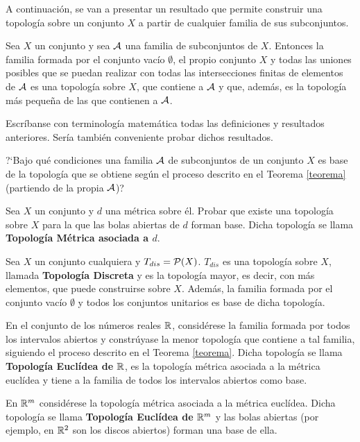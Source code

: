 \documentclass[cursovd_portada.tex]{subfiles}
\begin{document}
A continuación, se van a presentar un resultado que permite construir una topología sobre un conjunto $X$ a partir
de cualquier familia de sus subconjuntos.
\begin{teorema}\label{teorema}
Sea $X$ un conjunto y sea ${\cal A}$ una familia de subconjuntos de $X$. Entonces la familia formada por el
conjunto vacío $\emptyset$, el propio conjunto $X$ y todas las uniones posibles que se puedan realizar con todas
las intersecciones finitas de elementos de ${\cal A}$ es una topología sobre $X$, que contiene a ${\cal A}$ y que,
además, es la topología más peque\~{n}a de las que contienen a ${\cal A}$.
\end{teorema}
\begin{ejer}
\begin{enumerate}
{\rm
\item Escríbanse con terminología matemática todas las definiciones y resultados anteriores. Sería también
conveniente probar dichos resultados.
\item ?`Bajo qué condiciones una familia ${\cal A}$ de subconjuntos de un conjunto $X$ es base de la topología que
se obtiene según el proceso descrito en el Teorema \ref{teorema} (partiendo de la propia ${\cal A}$)?
\item Sea $X$ un conjunto y $d$ una métrica sobre él. Probar que existe una topología sobre $X$ para la que las
bolas abiertas de $d$ forman base. Dicha topología se llama {\bf Topología Métrica asociada a $d$}.}
\end{enumerate}
\end{ejer}
\begin{ejer}
\begin{enumerate}
{\rm
\item Sea $X$ un conjunto cualquiera y $T_{dis}={\cal P}(X)$. $T_{dis}$ es una topología sobre $X$, llamada {\bf
Topología Discreta} y es la topología mayor, es decir, con más elementos, que puede construirse sobre $X$. Además,
la familia formada por el conjunto vacío $\emptyset$ y todos los conjuntos unitarios es base de dicha topología.
\item En el conjunto de los números reales $\mathbb{R}$, considérese la familia formada por todos los intervalos abiertos
y constrúyase la menor topología que contiene a tal familia, siguiendo el proceso descrito en el Teorema \ref{teorema}.
Dicha topología se llama {\bf Topología Euclídea de $\mathbb{R}$}, es la topología métrica asociada a la métrica euclídea
y tiene a la familia de todos los intervalos abiertos como base.
\item En $\mathbb{R}^m$ considérese la topología métrica asociada a la métrica euclídea. Dicha topología se llama {\bf
Topología Euclídea de $\mathbb{R}^m$} y las bolas abiertas (por ejemplo, en $\mathbb{R}^2$ son los discos abiertos) forman una
base de ella.}
\end{enumerate}
\end{ejer}
\end{document}
